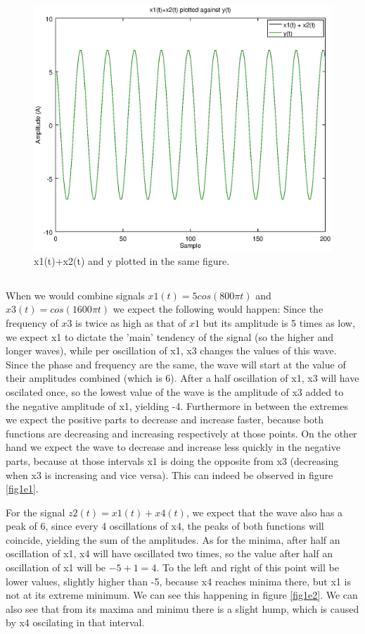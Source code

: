 \documentclass{article}
\begin{document}
\begin{figure}[H]
  \centering
  \includegraphics[width=.7\columnwidth]{plot4B.eps}
  \caption{x1(t)+x2(t) and y plotted in the same figure.}
  \label{fig2d2}
\end{figure}

\subsection{}
When we would combine signals $x1(t) = 5cos(800 \pi t)$ and $x3(t) = cos (1600 \pi t)$ we expect the following would happen: Since the frequency of $x3$ is twice as high as that of $x1$ but its amplitude is 5 times as low,
we expect x1 to dictate the 'main' tendency of the signal (so the higher and longer waves), while per oscillation of x1, x3 changes the values of this wave. Since the phase and frequency are the same, the wave will start at
the value of their amplitudes combined (which is 6). After a half oscillation of x1, x3 will have oscilated once, so the lowest value of the wave is the amplitude of x3 added to the negative amplitude of x1, yielding -4.
Furthermore in between the extremes we expect the positive parts to decrease and increase faster, because both functions are decreasing and increasing respectively at those points. On the other hand we expect
the wave to decrease and increase less quickly in the negative parts, because at those intervals x1 is doing the opposite from x3 (decreasing when x3 is increasing and vice versa). This can indeed be observed in figure \ref{fig1e1}.

For the signal $z2(t) = x1(t) + x4(t)$, we expect that the wave also has a peak of 6, since every 4 oscillations of x4, the peaks of both functions will coincide, yielding the sum of the amplitudes.
As for the minima, after half an oscillation of x1, x4 will have oscillated two times, so the value after half an oscillation of x1 will be $-5 + 1 = 4$. To the left and right of this point will be lower values,
slightly higher than -5, because x4 reaches minima there, but x1 is not at its extreme minimum. We can see this happening in figure \ref{fig1e2}. We can also see that from its maxima and minimu there is a slight
hump, which is caused by x4 oscilating in that interval.
\end{document}
